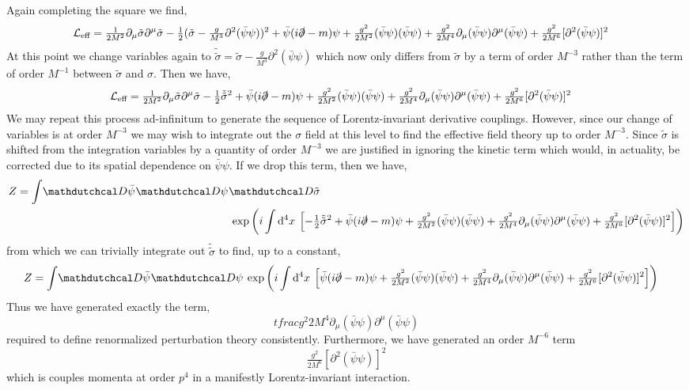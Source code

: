 \documentclass[12pt]{article}
\begin{document}
Again completing the square we find,
\begin{align*}
\mathcal{L}_{\text{eff}} 
& = \tfrac{1}{2M^2} \partial_\mu \tilde{\sigma} \partial^\mu \tilde{\sigma} - \tfrac{1}{2} (\tilde{\sigma} - \tfrac{g}{M^3} \partial^2 (\bar{\psi} \psi) )^2 
+ \bar{\psi} (i \slashed{\partial} - m)\psi + \tfrac{g^2}{2M^2} (\bar{\psi} \psi)(\bar{\psi} \psi) + \tfrac{g^2}{2M^4} \partial_\mu (\bar{\psi} \psi) \partial^\mu (\bar{\psi} \psi) + \tfrac{g^2}{2M^6} [\partial^2 (\bar{\psi} \psi)]^2 
\end{align*}
At this point we change variables again to $\tilde{\tilde{\sigma}} = \tilde{\sigma} - \tfrac{g}{M^3} \partial^2 (\bar{\psi} \psi)$ which now only differs from $\tilde{\sigma}$ by a term of order $M^{-3}$ rather than the term of order $M^{-1}$ between $\tilde{\sigma}$ and $\sigma$. Then we have, 
\begin{align*}
\mathcal{L}_{\text{eff}} 
& = \tfrac{1}{2M^2} \partial_\mu \tilde{\sigma} \partial^\mu \tilde{\sigma} - \tfrac{1}{2} \tilde{\tilde{\sigma}}^2 
+ \bar{\psi} (i \slashed{\partial} - m)\psi + \tfrac{g^2}{2M^2} (\bar{\psi} \psi)(\bar{\psi} \psi) + \tfrac{g^2}{2M^4} \partial_\mu (\bar{\psi} \psi) \partial^\mu (\bar{\psi} \psi) + \tfrac{g^2}{2M^6} [\partial^2 (\bar{\psi} \psi)]^2 
\end{align*}
We may repeat this process ad-infinitum to generate the sequence of Lorentz-invariant derivative couplings. However, since our change of variables is at order $M^{-3}$ we may wish to integrate out the $\sigma$ field at this level to find the effective field theory up to order $M^{-3}$. Since $\tilde{\sigma}$ is shifted from the integration variables by a quantity of order $M^{-3}$ we are justified in ignoring the kinetic term which would, in actuality, be corrected due to its spatial dependence on $\bar{\psi} \psi$. If we drop this term, then we have, 
\begin{align*}
Z = \int \pathd{\bar{\psi}} \pathd{\psi} & \pathd{\tilde{\sigma}}
\\
& \exp{\left( i \int \dn{4}{x} \left[ - \tfrac{1}{2} \tilde{\tilde{\sigma}}^2 
+ \bar{\psi} (i \slashed{\partial} - m)\psi + \tfrac{g^2}{2M^2} (\bar{\psi} \psi)(\bar{\psi} \psi) + \tfrac{g^2}{2M^4} \partial_\mu (\bar{\psi} \psi) \partial^\mu (\bar{\psi} \psi) + \tfrac{g^2}{2M^6} [\partial^2 (\bar{\psi} \psi)]^2 \right] \right)}
\end{align*}
from which we can trivially integrate out $\tilde{\tilde{\sigma}}$ to find, up to a constant,
\begin{align*}
Z & = \int \pathd{\bar{\psi}} \pathd{\psi} \exp{\left( i \int \dn{4}{x} \left[ \bar{\psi} (i \slashed{\partial} - m)\psi + \tfrac{g^2}{2M^2} (\bar{\psi} \psi)(\bar{\psi} \psi) + \tfrac{g^2}{2M^4} \partial_\mu (\bar{\psi} \psi) \partial^\mu (\bar{\psi} \psi) + \tfrac{g^2}{2M^6} [\partial^2 (\bar{\psi} \psi)]^2 \right] \right)}
\end{align*}
Thus we have generated exactly the term,
\[ tfrac{g^2}{2M^4} \partial_\mu (\bar{\psi} \psi) \partial^\mu (\bar{\psi} \psi) \]
required to define renormalized perturbation theory consistently. Furthermore, we have generated an order $M^{-6}$ term
\[ \tfrac{g^2}{2M^6} [\partial^2 (\bar{\psi} \psi)]^2 \]
which is couples momenta at order $p^4$ in a manifestly Lorentz-invariant interaction. 
\end{document}
